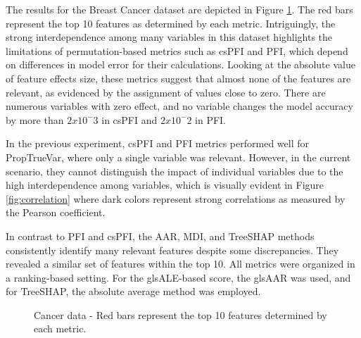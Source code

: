 The results for the Breast Cancer dataset are depicted in Figure \ref{fig:cancer}. The red bars represent the top 10 features as determined by each metric. Intriguingly, the strong interdependence among many variables in this dataset highlights the limitations of permutation-based metrics such as \gls{csPFI} and \gls{PFI}, which depend on differences in model error for their calculations. Looking at the absolute value of feature effects size, these metrics suggest that almost none of the features are relevant, as evidenced by the assignment of values close to zero. There are numerous variables with zero effect, and no variable changes the model accuracy by more than \(2 x 10^-3\) in \gls{csPFI} and \(2 x 10^-2\) in \gls{PFI}. 

In the previous experiment, \gls{csPFI} and \gls{PFI} metrics performed well for PropTrueVar, where only a single variable was relevant. However, in the current scenario, they cannot distinguish the impact of individual variables due to the high interdependence among variables, which is visually evident in Figure \ref{fig:correlation} where dark colors represent strong correlations as measured by the Pearson coefficient.

In contrast to \gls{PFI} and \gls{csPFI}, the \gls{AAR}, \gls{MDI}, and TreeSHAP methods consistently identify many relevant features despite some discrepancies. They revealed a similar set of features within the top 10. All metrics were organized in a ranking-based setting. For the gls{ALE}-based score, the gls{AAR} was used, and for TreeSHAP, the absolute average method was employed.

\begin{figure}[ht!]
\centering
  \caption{Cancer data - Red bars represent the top 10 features determined by each metric.}
    \label{fig:cancer}
\end{figure}

